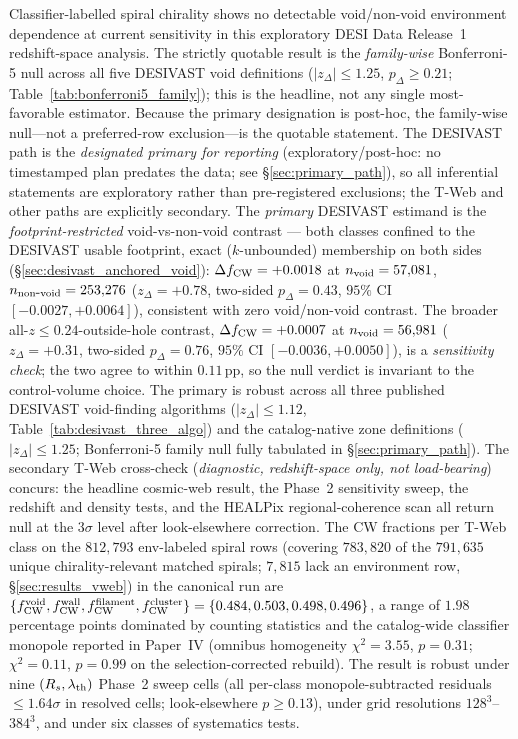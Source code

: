 \documentclass[aps,prd,twocolumn,superscriptaddress,showpacs,preprintnumbers,nofootinbib,longbibliography,floatfix]{revtex4-2}
\begin{document}
\iffalse
Classifier-labelled spiral chirality shows no detectable void/non-void
environment dependence at current sensitivity in this exploratory DESI
Data Release~1 redshift-space analysis.
The strictly quotable result is the \emph{family-wise} Bonferroni-5 null
across all five DESIVAST void definitions ($|z_\Delta|\!\le\!1.25$,
$p_\Delta\!\ge\!0.21$; Table~\ref{tab:bonferroni5_family}); this is the
headline, not any single most-favorable estimator.
Because the primary designation is post-hoc, the family-wise null---not
a preferred-row exclusion---is the quotable statement. The DESIVAST path is the
\emph{designated primary for reporting} (exploratory/post-hoc: no
timestamped plan predates the data; see \S\ref{sec:primary_path}), so
all inferential statements are exploratory rather than pre-registered exclusions;
the T-Web and other paths are explicitly secondary.
The \emph{primary} DESIVAST estimand is the
\emph{footprint-restricted} void-vs-non-void contrast --- both classes
confined to the DESIVAST usable footprint, exact ($k$-unbounded)
membership on both sides (\S\ref{sec:desivast_anchored_void}):
$\Delta f_{\rm CW} = +0.0018$ at $n_{\rm void} = 57{,}081$,
$n_{\rm non\mbox{-}void} = 253{,}276$
($z_\Delta = +0.78$, two-sided $p_\Delta = 0.43$, $95\%$ CI
$[-0.0027, +0.0064]$), consistent with zero void/non-void contrast. The broader
all-$z\!\le\!0.24$-outside-hole contrast, $\Delta f_{\rm CW} = +0.0007$
at $n_{\rm void} = 56{,}981$
($z_\Delta = +0.31$, two-sided $p_\Delta = 0.76$, $95\%$ CI
$[-0.0036, +0.0050]$), is a \emph{sensitivity check}; the two agree to
within $0.11$\,pp, so the null verdict is invariant to the control-volume
choice. The primary is robust across all three published DESIVAST
void-finding algorithms ($|z_\Delta| \leq 1.12$,
Table~\ref{tab:desivast_three_algo}) and the catalog-native zone
definitions ($|z_\Delta| \leq 1.25$; Bonferroni-5 family null
fully tabulated in \S\ref{sec:primary_path}). The secondary T-Web cross-check
(\emph{diagnostic, redshift-space only, not load-bearing}) concurs:
the headline cosmic-web result, the Phase~2 sensitivity sweep, the
redshift and density tests, and the HEALPix regional-coherence scan
all return null at the $3\sigma$ level after look-elsewhere correction.
The CW fractions per T-Web class on the $812{,}793$ env-labeled spiral
rows (covering $783{,}820$ of the $791{,}635$ unique chirality-relevant
matched spirals; $7{,}815$ lack an environment row,
\S\ref{sec:results_vweb}) in the canonical run are
$\{f_{\rm CW}^{\rm void}, f_{\rm CW}^{\rm wall},
f_{\rm CW}^{\rm filament}, f_{\rm CW}^{\rm cluster}\} =
\{0.484, 0.503, 0.498, 0.496\}$, a range of $1.98$\,percentage points
dominated by counting statistics and the catalog-wide classifier
monopole reported in Paper~IV (omnibus homogeneity
$\chi^2 = 3.55$, $p = 0.31$; $\chi^2 = 0.11$, $p = 0.99$ on the
selection-corrected rebuild). The result is robust under nine
$(R_s, \lambda_{\rm th})$ Phase~2 sweep cells (all per-class
monopole-subtracted residuals $\le 1.64\sigma$ in resolved cells; look-elsewhere
$p \ge 0.13$), under grid resolutions $128^3$--$384^3$, and under six
classes of systematics tests.
\end{document}
